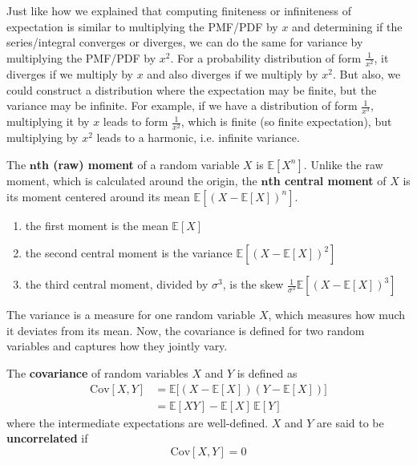 \documentclass{article}
\begin{document}
    Just like how we explained that computing finiteness or infiniteness of expectation is similar to multiplying the PMF/PDF by $x$ and determining if the series/integral converges or diverges, we can do the same for variance by multiplying the PMF/PDF by $x^2$. For a probability distribution of form $\frac{1}{x^2}$, it diverges if we multiply by $x$ and also diverges if we multiply by $x^2$. But also, we could construct a distribution where the expectation may be finite, but the variance may be infinite. For example, if we have a distribution of form $\frac{1}{x^3}$, multiplying it by $x$ leads to form $\frac{1}{x^2}$, which is finite (so finite expectation), but multiplying by $x^2$ leads to a harmonic, i.e. infinite variance. 

    \begin{definition}[Moment]
      The \textbf{$\mathbf{n}$th (raw) moment} of a random variable $X$ is $\mathbb{E}[X^n]$. Unlike the raw moment, which is calculated around the origin, the \textbf{$\mathbf{n}$th central moment} of $X$ is its moment centered around its mean $\mathbb{E}[(X - \mathbb{E}[X])^n]$. 
      \begin{enumerate}
        \item the first moment is the mean $\mathbb{E}[X]$
        \item the second central moment is the variance $\mathbb{E}[(X - \mathbb{E}[X])^2]$ 
        \item the third central moment, divided by $\sigma^3$, is the skew $\frac{1}{\sigma^3} \mathbb{E}[(X - \mathbb{E}[X])^3]$ 
      \end{enumerate}
    \end{definition}

    The variance is a measure for one random variable $X$, which measures how much it deviates from its mean. Now, the covariance is defined for two random variables and captures how they jointly vary. 

    \begin{definition}[Covariance]
      The \textbf{covariance} of random variables $X$ and $Y$ is defined as 
      \begin{align*}
        \mathrm{Cov}[X, Y] & = \mathbb{E} \big[ (X - \mathbb{E}[X]) (Y - \mathbb{E}[X]) \big] \\
        & = \mathbb{E}[X Y] - \mathbb{E}[X] \, \mathbb{E}[Y]
      \end{align*}
      where the intermediate expectations are well-defined. $X$ and $Y$ are said to be \textbf{uncorrelated} if 
      \begin{equation}
        \mathrm{Cov}[X, Y] = 0
      \end{equation}
    \end{definition}
\end{document}
